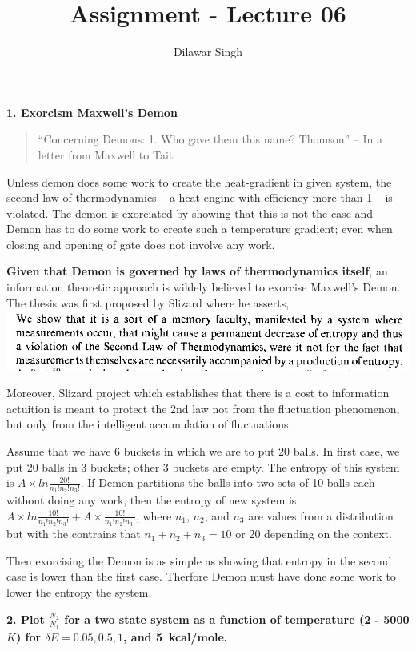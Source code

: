 \documentclass[]{article}
\title{Assignment - Lecture 06}
\author{Dilawar Singh}
\date{}
\begin{document}
\maketitle

\textbf{1. Exorcism Maxwell's Demon}

\begin{quote}
``Concerning Demons: 1. Who gave them this name? Thomson'' -- In a
letter from Maxwell to Tait
\end{quote}

Unless demon does some work to create the heat-gradient in given system,
the second law of thermodynamics -- a heat engine with efficiency more
than 1 -- is violated. The demon is exorciated by showing that this is
not the case and Demon has to do some work to create such a temperature
gradient; even when closing and opening of gate does not involve any
work.

\textbf{Given that Demon is governed by laws of thermodynamics itself},
an information theoretic approach is wildely believed to exorcise
Maxwell's Demon. The thesis was first proposed by Slizard where he
asserts, \includegraphics{./slizard.png}

Moreover, Slizard project which establishes that there is a cost to
information actuition is meant to protect the 2nd law not from the
fluctuation phenomenon, but only from the intelligent accumulation of
fluctuations.

Assume that we have 6 buckets in which we are to put 20 balls. In first
case, we put 20 balls in 3 buckets; other 3 buckets are empty. The
entropy of this system is $A \times ln \frac{20!}{n_1! n_2! n_3!}$. If
Demon partitions the balls into two sets of 10 balls each without doing
any work, then the entropy of new system is
$A \times ln \frac{10!}{n_1! n_2! n_3!} + A \times \frac{10!}{n_1! n_2! n_3!}$,
where $n_1$, $n_2$, and $n_3$ are values from a distribution but with
the contrains that $n_1 + n_2 + n_3 = 10$ or 20 depending on the
context.

Then exorcising the Demon is as simple as showing that entropy in the
second case is lower than the first case. Therfore Demon must have done
some work to lower the entropy the system.

\textbf{2. Plot $\frac{N_2}{N_1}$ for a two state system as a function
of temperature (2 - 5000 $K$) for $\delta E = 0.05, 0.5, 1$, and
\SI{5}{kcal/mole}.}
\end{document}

